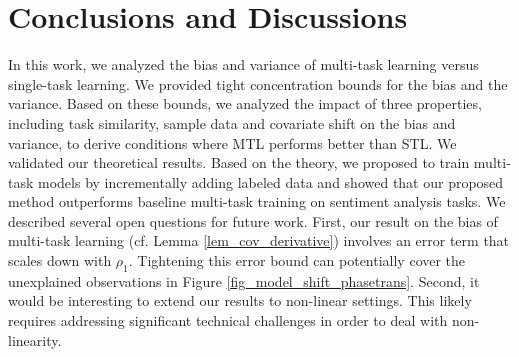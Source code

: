 \section{Conclusions and Discussions}

In this work, we analyzed the bias and variance of multi-task learning versus single-task learning.
We provided tight concentration bounds for the bias and the variance.
Based on these bounds, we analyzed the impact of three properties, including task similarity, sample data and covariate shift on the bias and variance, to derive conditions where MTL performs better than STL.
We validated our theoretical results.
Based on the theory, we proposed to train multi-task models by incrementally adding labeled data and showed that our proposed method outperforms baseline multi-task training on sentiment analysis tasks.
We described several open questions for future work.
First, our result on the bias of multi-task learning (cf. Lemma \ref{lem_cov_derivative}) involves an error term that scales down with $\rho_1$.
Tightening this error bound can potentially cover the unexplained observations in Figure \ref{fig_model_shift_phasetrans}.
Second, it would be interesting to extend our results to non-linear settings.
This likely requires addressing significant technical challenges in order to deal with non-linearity.